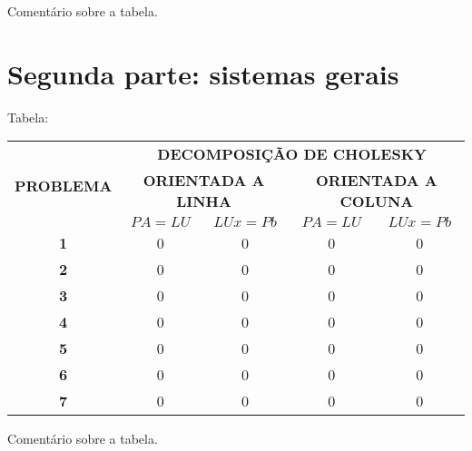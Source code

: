 \documentclass[a4paper,11pt]{article}
\begin{document}
Comentário sobre a tabela.


\section{Segunda parte:  sistemas gerais}

Tabela:

\begin{table}[h]
\begin{tabular}{|c|c|c|c|c|}
\hline
\multirow{3}{*}{\textbf{PROBLEMA}} & \multicolumn{4}{c|}{\textbf{DECOMPOSIÇÃO DE CHOLESKY}}                                             \\ \cline{2-5} 
                                   & \multicolumn{2}{c|}{\textbf{ORIENTADA A LINHA}} & \multicolumn{2}{c|}{\textbf{ORIENTADA A COLUNA}} \\ \cline{2-5} 
                                   & \textbf{$PA=LU$}         & \textbf{$LUx=Pb$}        & \textbf{$PA=LU$}         & \textbf{$LUx=Pb$}         \\ \hline
\textbf{1}                         & 0                      & 0                      & 0                      & 0                       \\ \hline
\textbf{2}                         & 0                      & 0                      & 0                      & 0                       \\ \hline
\textbf{3}                         & 0                      & 0                      & 0                      & 0                       \\ \hline
\textbf{4}                         & 0                      & 0                      & 0                      & 0                       \\ \hline
\textbf{5}                         & 0                      & 0                      & 0                      & 0                       \\ \hline
\textbf{6}                         & 0                      & 0                      & 0                      & 0                       \\ \hline
\textbf{7}                         & 0                      & 0                      & 0                      & 0                       \\ \hline
\end{tabular}
\end{table}

Comentário sobre a tabela.
\end{document}
